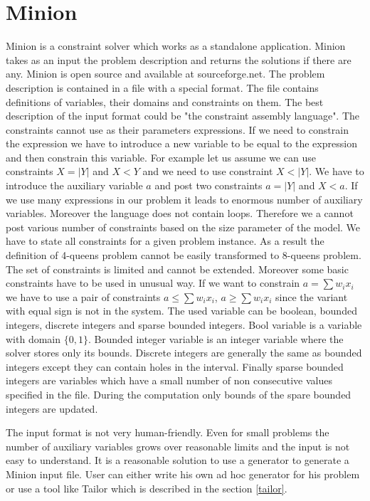 \section{Minion}

Minion is a constraint solver which works as a standalone application. Minion takes
as an input the problem description and returns the solutions if there are any.
Minion is open source and available at sourceforge.net. The problem description
is contained in a file with a special format. The file contains definitions of variables,
their domains and constraints on them. The best description of the input format could
be "the constraint assembly language". The constraints cannot use as their parameters 
expressions. If we need to constrain the expression we have to introduce a new variable
to be equal to the expression and then constrain this variable. For example let us assume 
we can use constraints $X = |Y|$ and $X < Y$ and we need to use constraint $X < |Y|$.
We have to introduce the auxiliary variable $a$ and post two constraints $a = |Y|$ and
 $X < a$. If we use many expressions in our problem it leads to enormous number of
 auxiliary variables. Moreover the language does not contain loops. Therefore we
 a cannot post various number of constraints based on the size parameter of the model.
 We have to state all constraints for a given problem instance. As a result the definition
 of 4-queens problem cannot be easily transformed to 8-queens problem. The set of constraints
 is limited and cannot be extended. Moreover some basic constraints have to be used in unusual way.
 If we want to constrain $a = \sum{w_i x_i}$ we have to use a pair of constraints
 $a \leq \sum{w_i x_i}$, $a \geq \sum{w_i x_i}$ since the variant with equal sign
 is not in the system. The used variable can be boolean, bounded integers, discrete integers
 and sparse bounded integers. Bool variable is a variable with domain $\{0,1\}$.
 Bounded integer variable is an integer variable where the solver stores only its bounds.
 Discrete integers are generally the same as bounded integers except they can contain 
 holes in the interval. Finally sparse bounded integers are variables which have a small
 number of non consecutive values specified in the file. During the computation
 only bounds of the spare bounded integers are updated.  
 
The input format is not very human-friendly. Even for small problems the number of
auxiliary variables grows over reasonable limits and the input is not easy to understand.
It is a reasonable solution to use a generator to generate a Minion input file.
User can either write his own ad hoc generator for his problem or use a tool like
Tailor which is described in the section \ref{tailor}.

